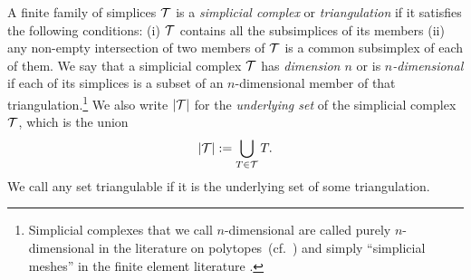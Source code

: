 \documentclass[10pt,letterpaper]{article}
\newcommand\cye[1]{%
\protect\leavevmode
\begingroup
    \color{red!35!yellow}%
    #1%
\endgroup
}
\begin{document}
A finite family of simplices ${\mathcal T}$ is a \emph{simplicial complex} or \emph{triangulation} if it satisfies the following conditions: 
(i) ${\mathcal T}$ contains all the subsimplices of its members (ii) any non-empty intersection of two members of ${\mathcal T}$ is a common subsimplex of each of them. 
We say that a simplicial complex ${\mathcal T}$ has \textit{dimension $n$} or is \textit{$n$-dimensional} if each of its simplices is a subset of an $n$-dimensional member of that triangulation.\footnote{Simplicial complexes that we call $n$-dimensional are called purely $n$-dimensional in the literature on polytopes~(cf.\ \cite{ziegler1995lectures}) \cye{and simply ``simplicial meshes'' in the finite element literature}.} 
We also write $\left| {\mathcal T} \right|$ for the \textit{underlying set} of the simplicial complex ${\mathcal T}$, which is the union 
\begin{align*}
    \left| {\mathcal T} \right| := \bigcup_{ T \in {\mathcal T} } T
    .
\end{align*}
We call any set triangulable if it is the underlying set of some triangulation. 
\\

\end{document}
